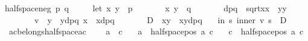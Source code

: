 \begin{isabellebody}
{\isachardoublequoteopen}halfspace{\isacharunderscore}{\kern0pt}neg\ p\ q\ {\isasymequiv}\ \isanewline
\ \ \ let\ {\isacharparenleft}{\kern0pt}x{}{\isacharcomma}{\kern0pt}\ y{}{\isacharparenright}{\kern0pt}\ {\isacharequal}{\kern0pt}\ p{\isacharsemicolon}{\kern0pt}\isanewline
\ \ \ \ \ \ \ {\isacharparenleft}{\kern0pt}x{}{\isacharcomma}{\kern0pt}\ y{}{\isacharparenright}{\kern0pt}\ {\isacharequal}{\kern0pt}\ q{\isacharsemicolon}{\kern0pt}\isanewline
\ \ \ \ \ \ \ dpq\ {\isacharequal}{\kern0pt}\ sqrt{\isacharparenleft}{\kern0pt}{\isacharparenleft}{\kern0pt}x{}{\isacharminus}{\kern0pt}x{}{\isacharparenright}{\kern0pt}{\isacharcircum}{\kern0pt}{}\ {\isacharplus}{\kern0pt}\ {\isacharparenleft}{\kern0pt}y{}{\isacharminus}{\kern0pt}y{}{\isacharparenright}{\kern0pt}{\isacharcircum}{\kern0pt}{}{\isacharparenright}{\kern0pt}{\isacharsemicolon}{\kern0pt}\isanewline
\ \ \ \ \ \ \ v\ {\isacharequal}{\kern0pt}\ {\isacharparenleft}{\kern0pt}{\isacharparenleft}{\kern0pt}y{}\ {\isacharminus}{\kern0pt}\ y{}{\isacharparenright}{\kern0pt}{\isacharslash}{\kern0pt}dpq{\isacharcomma}{\kern0pt}\ {\isacharparenleft}{\kern0pt}x{}\ {\isacharminus}{\kern0pt}\ x{}{\isacharparenright}{\kern0pt}{\isacharslash}{\kern0pt}dpq{\isacharparenright}{\kern0pt}{\isacharsemicolon}{\kern0pt}\isanewline
\ \ \ \ \ \ \ D\ {\isacharequal}{\kern0pt}\ {\isacharparenleft}{\kern0pt}x{}{\isacharasterisk}{\kern0pt}y{}\ {\isacharminus}{\kern0pt}\ x{}{\isacharasterisk}{\kern0pt}y{}{\isacharparenright}{\kern0pt}{\isacharslash}{\kern0pt}dpq\isanewline
\ \ \ in\ {\isacharbraceleft}{\kern0pt}s{\isachardot}{\kern0pt}\ inner\ v\ s\ {\isasymle}\ D{\isacharbraceright}{\kern0pt}{\isachardoublequoteclose}\isanewline
\isanewline
\isanewline
{}\isamarkupfalse%
\ a{\isacharunderscore}{\kern0pt}c{\isacharunderscore}{\kern0pt}belongs{\isacharunderscore}{\kern0pt}halfspace{\isacharunderscore}{\kern0pt}a{\isacharunderscore}{\kern0pt}c{\isacharcolon}{\kern0pt}\ \isanewline
\ \ \ {\isachardoublequoteopen}a\ {\isasymnoteq}\ c{\isachardoublequoteclose}\isanewline
\ \ \ {\isachardoublequoteopen}a\ {\isasymin}\ halfspace{\isacharunderscore}{\kern0pt}pos\ a\ c{\isachardoublequoteclose}\isanewline
\ \ \ {\isachardoublequoteopen}c\ {\isasymin}\ halfspace{\isacharunderscore}{\kern0pt}pos\ a\ c{\isachardoublequoteclose}\isanewline
%
\isadelimproof

\end{isabellebody}
